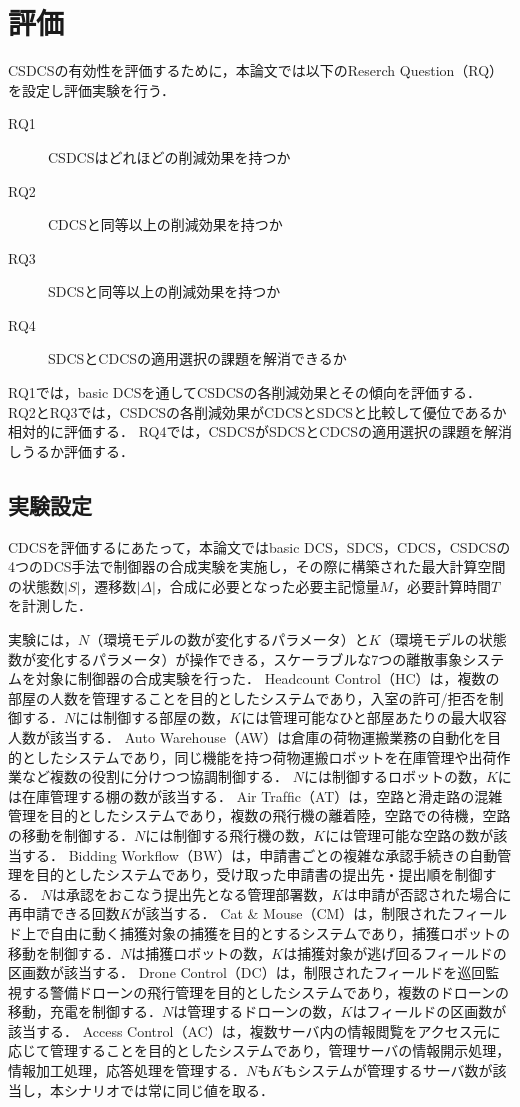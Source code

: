 \section{評価}
\label{section:evaluation}
CSDCSの有効性を評価するために，本論文では以下のReserch Question（RQ）を設定し評価実験を行う．

{
\begin{description}
  \item[RQ1] CSDCSはどれほどの削減効果を持つか
  \item[RQ2] CDCSと同等以上の削減効果を持つか
  \item[RQ3] SDCSと同等以上の削減効果を持つか
  \item[RQ4] SDCSとCDCSの適用選択の課題を解消できるか
\end{description}
}

RQ1では，basic DCSを通してCSDCSの各削減効果とその傾向を評価する．
RQ2とRQ3では，CSDCSの各削減効果がCDCSとSDCSと比較して優位であるか相対的に評価する．
RQ4では，CSDCSがSDCSとCDCSの適用選択の課題を解消しうるか評価する．

\subsection{実験設定}
CDCSを評価するにあたって，本論文ではbasic DCS，SDCS，CDCS，CSDCSの4つのDCS手法で制御器の合成実験を実施し，その際に構築された最大計算空間の状態数$|S|$，遷移数$|\Delta|$，合成に必要となった必要主記憶量$M$，必要計算時間$T$を計測した．

実験には，$N$（環境モデルの数が変化するパラメータ）と$K$（環境モデルの状態数が変化するパラメータ）が操作できる，スケーラブルな7つの離散事象システムを対象に制御器の合成実験を行った．
Headcount Control（HC）\cite{paper:ArtGallery}は，複数の部屋の人数を管理することを目的としたシステムであり，入室の許可/拒否を制御する．$N$には制御する部屋の数，$K$には管理可能なひと部屋あたりの最大収容人数が該当する．
Auto Warehouse（AW）\cite{paper:KIVA_System}は倉庫の荷物運搬業務の自動化を目的としたシステムであり，同じ機能を持つ荷物運搬ロボットを在庫管理や出荷作業など複数の役割に分けつつ協調制御する．
$N$には制御するロボットの数，$K$には在庫管理する棚の数が該当する．
Air Trafﬁc（AT）は，空路と滑走路の混雑管理を目的としたシステムであり，複数の飛行機の離着陸，空路での待機，空路の移動を制御する．$N$には制御する飛行機の数，$K$には管理可能な空路の数が該当する．
Bidding Workflow（BW）は，申請書ごとの複雑な承認手続きの自動管理を目的としたシステムであり，受け取った申請書の提出先・提出順を制御する．
$N$は承認をおこなう提出先となる管理部署数，$K$は申請が否認された場合に再申請できる回数$K$が該当する．
Cat \& Mouse（CM）は，制限されたフィールド上で自由に動く捕獲対象の捕獲を目的とするシステムであり，捕獲ロボットの移動を制御する．$N$は捕獲ロボットの数，$K$は捕獲対象が逃げ回るフィールドの区画数が該当する．
Drone Control（DC）は，制限されたフィールドを巡回監視する警備ドローンの飛行管理を目的としたシステムであり，複数のドローンの移動，充電を制御する．$N$は管理するドローンの数，$K$はフィールドの区画数が該当する．
Access Control（AC）は，複数サーバ内の情報閲覧をアクセス元に応じて管理することを目的としたシステムであり，管理サーバの情報開示処理，情報加工処理，応答処理を管理する．$N$も$K$もシステムが管理するサーバ数が該当し，本シナリオでは常に同じ値を取る．

